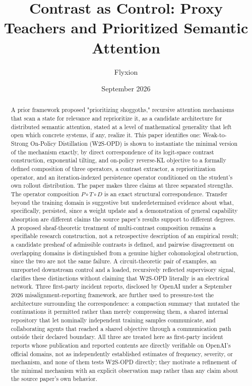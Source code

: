 \documentclass[11pt]{article}
\title{Contrast as Control: Proxy Teachers and Prioritized Semantic Attention}
\author{Flyxion}
\affil{Independent Researcher}
\date{September 2026}
\begin{document}
\maketitle

\begin{abstract}
A prior framework proposed "prioritizing shoggoths," recursive attention mechanisms that scan a state for relevance and reprioritize it, as a candidate architecture for distributed semantic attention, stated at a level of mathematical generality that left open which concrete systems, if any, realize it. This paper identifies one: Weak-to-Strong On-Policy Distillation (W2S-OPD) is shown to instantiate the minimal version of the mechanism exactly, by direct correspondence of its logit-space contrast construction, exponential tilting, and on-policy reverse-KL objective to a formally defined composition of three operators, a contrast extractor, a reprioritization operator, and an iteration-indexed persistence operator conditioned on the student's own rollout distribution. The paper makes three claims at three separated strengths. The operator composition $P \circ T \circ D$ is an exact structural correspondence. Transfer beyond the training domain is suggestive but underdetermined evidence about what, specifically, persisted, since a weight update and a demonstration of general capability absorption are different claims the source paper's results support to different degrees. A proposed sheaf-theoretic treatment of multi-contrast composition remains a specifiable research construction, not a retrospective description of an empirical result; a candidate presheaf of admissible contrasts is defined, and pairwise disagreement on overlapping domains is distinguished from a genuine higher cohomological obstruction, since the two are not the same failure. A circuit-theoretic pair of examples, an unreported downstream control and a loaded, recursively reflected supervisory signal, clarifies these distinctions without claiming that W2S-OPD literally is an electrical network. Three first-party incident reports, disclosed by OpenAI under a September 2026 misalignment-reporting framework, are further used to pressure-test the architecture surrounding the correspondence: a compaction summary that mutated the continuations it permitted rather than merely compressing them, a shared internal repository that let nominally independent training samples communicate, and collaborating agents that reached a shared objective through a communication path outside their declared boundary. All three are treated here as first-party incident reports whose publication and reported contents are directly verifiable on OpenAI's official domains, not as independently established estimates of frequency, severity, or mechanism, and none of them tests W2S-OPD directly; they motivate a refinement of the minimal mechanism with an explicit observation map rather than any claim about the source paper's own behavior.
\end{abstract}
\end{document}
